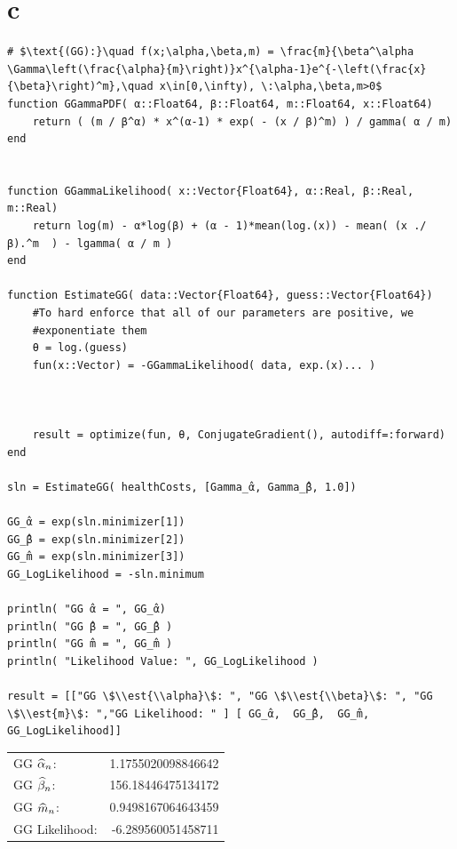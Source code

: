 \documentclass[12pt, letterpaper]{paper}
\begin{document}
\section{c}
\label{sec:orge2c0c7f}
\begin{verbatim}
# $\text{(GG):}\quad f(x;\alpha,\beta,m) = \frac{m}{\beta^\alpha \Gamma\left(\frac{\alpha}{m}\right)}x^{\alpha-1}e^{-\left(\frac{x}{\beta}\right)^m},\quad x\in[0,\infty), \:\alpha,\beta,m>0$
function GGammaPDF( α::Float64, β::Float64, m::Float64, x::Float64)
    return ( (m / β^α) * x^(α-1) * exp( - (x / β)^m) ) / gamma( α / m)
end


function GGammaLikelihood( x::Vector{Float64}, α::Real, β::Real, m::Real)
    return log(m) - α*log(β) + (α - 1)*mean(log.(x)) - mean( (x ./ β).^m  ) - lgamma( α / m )    
end

function EstimateGG( data::Vector{Float64}, guess::Vector{Float64})
    #To hard enforce that all of our parameters are positive, we
    #exponentiate them
    θ = log.(guess)
    fun(x::Vector) = -GGammaLikelihood( data, exp.(x)... )



    result = optimize(fun, θ, ConjugateGradient(), autodiff=:forward)
end

sln = EstimateGG( healthCosts, [Gamma_̂α, Gamma_̂β, 1.0])

GG_̂α = exp(sln.minimizer[1])
GG_̂β = exp(sln.minimizer[2])
GG_̂m = exp(sln.minimizer[3])
GG_LogLikelihood = -sln.minimum

println( "GG ̂α = ", GG_̂α)
println( "GG ̂β = ", GG_̂β )
println( "GG ̂m = ", GG_̂m )
println( "Likelihood Value: ", GG_LogLikelihood )

result = [["GG \$\\est{\\alpha}\$: ", "GG \$\\est{\\beta}\$: ", "GG \$\\est{m}\$: ","GG Likelihood: " ] [ GG_̂α,  GG_̂β,  GG_̂m, GG_LogLikelihood]]

\end{verbatim}

\begin{center}
\begin{tabular}{lr}
GG \(\widehat{ \alpha }_{n}\): & 1.1755020098846642\\
GG \(\widehat{ \beta }_{n}\): & 156.18446475134172\\
GG \(\widehat{ m }_{n}\): & 0.9498167064643459\\
GG Likelihood: & -6.289560051458711\\
\end{tabular}
\end{center}
\end{document}
